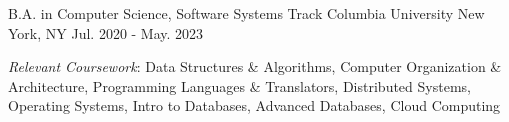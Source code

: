 

\begin{cventries}

  \cventry
    {B.A. in Computer Science, Software Systems Track} %
    {Columbia University} %
    {New York, NY} %
    {Jul. 2020 - May. 2023} %
    {
      \begin{cvitems} %
        \item {\textit{Relevant Coursework}:}
        {Data Structures \& Algorithms, Computer Organization \& Architecture, Programming Languages \& Translators, Distributed Systems, Operating Systems, Intro to Databases, Advanced Databases, Cloud Computing}
      \end{cvitems}
    }
\end{cventries}